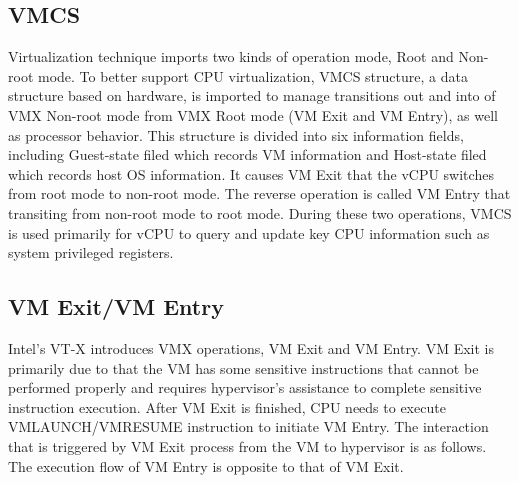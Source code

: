 ﻿\documentclass[conference]{IEEEtran}
\begin{document}
\subsection{VMCS}
Virtualization technique imports two kinds of operation mode, Root and Non-root mode. %
To better support CPU virtualization, VMCS structure, a data structure based on hardware, is imported to manage transitions out and into of VMX Non-root mode from VMX Root mode (VM Exit and VM Entry), as well as processor behavior.
This structure is divided into six information fields, including Guest-state filed which records VM information and Host-state filed which records host OS information.
It causes VM Exit that the vCPU switches from root mode to non-root mode. The reverse operation is called VM Entry that transiting from non-root mode to root mode. During these two operations, VMCS is used primarily for vCPU to query and update key CPU information such as system privileged registers.



%
\subsection{VM Exit/VM Entry}
Intel's VT-X introduces VMX operations, VM Exit and VM Entry. VM Exit is primarily due to that the VM has some sensitive instructions that cannot be performed properly and requires hypervisor's assistance to complete sensitive instruction execution. After VM Exit is finished, CPU needs to execute VMLAUNCH/VMRESUME instruction to initiate VM Entry. The interaction that is triggered by VM Exit process from the VM to hypervisor is as follows. The execution flow of VM Entry is opposite to that of VM Exit.
\end{document}
